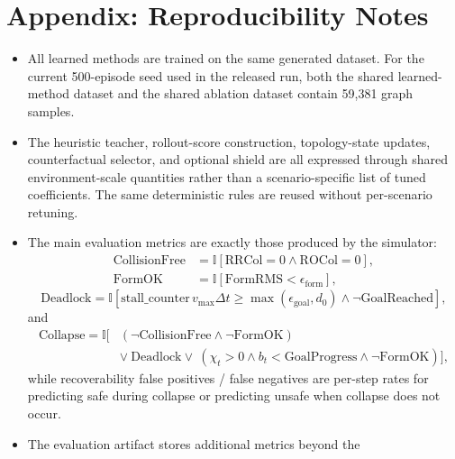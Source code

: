 \documentclass[journal]{IEEEtran}
\begin{document}
\section*{Appendix: Reproducibility Notes}
\begingroup\scriptsize
\begin{itemize}
    \item All learned methods are trained on the same generated dataset.
    For the current 500-episode seed used in the released run, both the
    shared learned-method dataset and the shared ablation dataset
    contain 59{,}381 graph samples.
    \item The heuristic teacher, rollout-score construction,
    topology-state updates, counterfactual selector, and optional shield
    are all expressed through shared environment-scale quantities rather
    than a scenario-specific list of tuned coefficients. The same
    deterministic rules are reused without per-scenario retuning.
    \item The main evaluation metrics are exactly those produced by the
    simulator:
    \begin{equation*}
    \begin{aligned}
    \mathrm{CollisionFree}
    &= \mathbb{I}[\mathrm{RRCol}=0 \wedge \mathrm{ROCol}=0], \\
    \mathrm{FormOK}
    &= \mathbb{I}[\mathrm{FormRMS}<\epsilon_{\mathrm{form}}],
    \end{aligned}
    \end{equation*}
    \begin{equation*}
    \mathrm{Deadlock}
    = \mathbb{I}\!\left[
    \mathrm{stall\_counter}\, v_{\max}\Delta t
    \ge \max(\epsilon_{\mathrm{goal}}, d_0)
    \wedge \neg \mathrm{GoalReached}
    \right],
    \end{equation*}
    and
    \begin{equation*}
    \begin{aligned}
    \mathrm{Collapse}
    = \mathbb{I}\bigl[
    &(\neg \mathrm{CollisionFree}
      \wedge \neg \mathrm{FormOK})
      \\
    &\vee\ \mathrm{Deadlock}
      \vee\ (\chi_t>0 \wedge b_t<\mathrm{GoalProgress}
      \wedge \neg \mathrm{FormOK})
    \bigr],
    \end{aligned}
    \end{equation*}
    while recoverability false positives / false negatives are
    per-step rates for predicting safe during collapse or predicting
    unsafe when collapse does not occur.
    \item The evaluation artifact stores additional metrics beyond the

\end{itemize}
\end{document}
